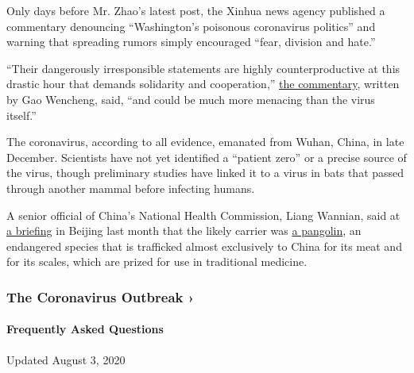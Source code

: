 Only days before Mr. Zhao's latest post, the Xinhua news agency
published a commentary denouncing ``Washington's poisonous coronavirus
politics'' and warning that spreading rumors simply encouraged ``fear,
division and hate.''

``Their dangerously irresponsible statements are highly
counterproductive at this drastic hour that demands solidarity and
cooperation,''
\href{http://www.xinhuanet.com/english/2020-03/09/c_138859548.htm}{the
commentary}, written by Gao Wencheng, said, ``and could be much more
menacing than the virus itself.''

The coronavirus, according to all evidence, emanated from Wuhan, China,
in late December. Scientists have not yet identified a ``patient zero''
or a precise source of the virus, though preliminary studies have linked
it to a virus in bats that passed through another mammal before
infecting humans.

A senior official of China's National Health Commission, Liang Wannian,
said at
\href{https://www.nytimes3xbfgragh.onion/2020/02/24/world/asia/china-coronavirus-world-health-organization.html}{a
briefing} in Beijing last month that the likely carrier was
\href{https://www.nytimes3xbfgragh.onion/2020/03/05/opinion/coronavirus-china-pangolins.html}{a
pangolin}, an endangered species that is trafficked almost exclusively
to China for its meat and for its scales, which are prized for use in
traditional medicine.

\href{https://www.nytimes3xbfgragh.onion/news-event/coronavirus?action=click\&pgtype=Article\&state=default\&region=MAIN_CONTENT_3\&context=storylines_faq}{}

\hypertarget{the-coronavirus-outbreak-}{%
\subsubsection{The Coronavirus Outbreak
›}\label{the-coronavirus-outbreak-}}

\hypertarget{frequently-asked-questions}{%
\paragraph{Frequently Asked
Questions}\label{frequently-asked-questions}}

Updated August 3, 2020

